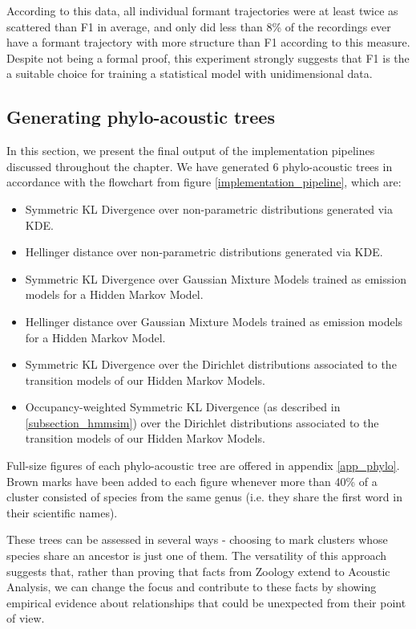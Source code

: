 \documentclass[../main.tex]{subfiles}
\begin{document}
\par According to this data, all individual formant trajectories were at least twice as scattered than F1 in average, and only did less than 8\% of the recordings ever have a formant trajectory with more structure than F1 according to this measure. Despite not being a formal proof, this experiment strongly suggests that F1 is the a suitable choice for training a statistical model with unidimensional data.

\subsection{Generating phylo-acoustic trees} \label{subsection_phylo}
In this section, we present the final output of the implementation pipelines discussed throughout the chapter. We have generated 6 phylo-acoustic trees in accordance with the flowchart from figure \ref{implementation_pipeline}, which are:
\begin{itemize}
\item Symmetric KL Divergence over non-parametric distributions generated via KDE.
\item Hellinger distance over non-parametric distributions generated via KDE.
\item Symmetric KL Divergence over Gaussian Mixture Models trained as emission models for a Hidden Markov Model.
\item Hellinger distance over Gaussian Mixture Models trained as emission models for a Hidden Markov Model.
\item Symmetric KL Divergence over the Dirichlet distributions associated to the transition models of our Hidden Markov Models.
\item Occupancy-weighted Symmetric KL Divergence (as described in \ref{subsection_hmmsim}) over the Dirichlet distributions associated to the transition models of our Hidden Markov Models.
\end{itemize}
\par Full-size figures of each phylo-acoustic tree are offered in appendix \ref{app_phylo}. Brown marks have been added to each figure whenever more than 40\% of a cluster consisted of species from the same genus (i.e. they share the first word in their scientific names). 
\par These trees can be assessed in several ways - choosing to mark clusters whose species share an ancestor is just one of them. The versatility of this approach suggests that, rather than proving that facts from Zoology extend to Acoustic Analysis, we can change the focus and contribute to these facts by showing empirical evidence about relationships that could be unexpected from their point of view.
\end{document}
